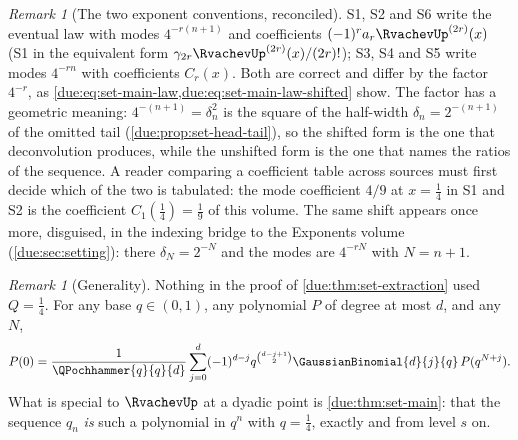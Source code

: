 \documentclass[11pt,oneside]{article}
\theoremstyle{plain}
\theoremstyle{definition}
\theoremstyle{remark}
\newtheorem{remark}[theorem]{Remark}
\newcommand{\upn}[1]{\RvachevUp_{#1}}
\newcommand{\Qq}{Q}                                         %
\newcommand{\am}[1]{a_{#1}}                                 %
\newcommand{\Cr}[2]{C_{#1}\!\left(#2\right)}                %
\newcommand{\qn}[1]{q_{#1}}                                 %
\begin{document}
\begin{remark}[The two exponent conventions, reconciled]
\label{due:rmk:set-exponent-conventions}
S1, S2 and S6 write the eventual law with modes $4^{-r(n+1)}$ and
coefficients $(-1)^{r}\am{r}\RvachevUp^{(2r)}(x)$ (S1 in the equivalent
form $\gamma_{2r}\RvachevUp^{(2r)}(x)/(2r)!$); S3, S4 and S5 write modes
$4^{-rn}$ with coefficients $\Cr{r}{x}$.  Both are correct and differ by
the factor $4^{-r}$, as \cref{due:eq:set-main-law,due:eq:set-main-law-shifted}
show.  The factor has a geometric meaning: $4^{-(n+1)}=\delta_n^{2}$ is the
square of the half-width $\delta_n=2^{-(n+1)}$ of the omitted tail
(\cref{due:prop:set-head-tail}), so the shifted form is the one that
deconvolution produces, while the unshifted form is the one that names the
ratios of the sequence.  A reader comparing a coefficient table across
sources must first decide which of the two is tabulated: the mode
coefficient $4/9$ at $x=\frac14$ in S1 and S2 is the coefficient
$\Cr{1}{\frac14}=\frac19$ of this volume.  The same shift appears once
more, disguised, in the indexing bridge to the Exponents volume
(\cref{due:sec:setting}): there $\delta_N=2^{-N}$ and the modes are
$4^{-rN}$ with $N=n+1$.
\end{remark}

\begin{remark}[Generality]
\label{due:rmk:set-generality}
Nothing in the proof of \cref{due:thm:set-extraction} used $\Qq=\frac14$.
For any base $q\in(0,1)$, any polynomial $P$ of degree at most $d$, and any
$N$,
\[
 P(0)=\frac{1}{\QPochhammer{q}{q}{d}}\sum_{j=0}^{d}(-1)^{d-j}q^{\binom{d-j+1}{2}}
 \GaussianBinomial{d}{j}{q}\,P(q^{N+j}).
\]
What is special to
$\RvachevUp$ at a dyadic point is \cref{due:thm:set-main}: that the
sequence $\qn{n}$ \emph{is} such a polynomial in $q^{n}$ with $q=\frac14$,
exactly and from level $s$ on.
\end{remark}
\end{document}
